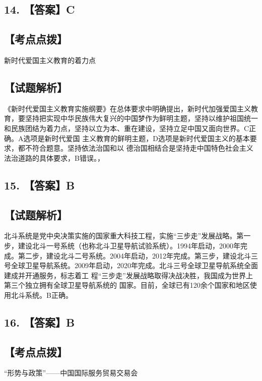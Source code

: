\documentclass[UTF8,11pt]{ctexart}
\begin{document}
\subsection*{14. 【答案】C}

\subsection*{【考点点拨】}

新时代爱国主义教育的着力点


\subsection*{【试题解析】}

《新时代爱国主义教育实施纲要》在总体要求中明确提出，新时代加强爱国主义教育，要坚持把实现中华民族伟大复兴的中国梦作为鲜明主题，坚持以维护祖国统一和民族团结为着力点，坚持以立为本、重在建设，坚持立足中国又面向世界。C正确。A选项是新时代爱国 主义教育的鲜明主题，D选项是新时代爱国主义的基本要求，都不符合题意。坚持依法治国和以 德治国相结合是坚持走中国特色社会主义法治道路的具体要求，B错误。，


\subsection*{15. 【答案】B}

\subsection*{【试题解析】}

北斗系统是党中央决策实施的国家重大科技工程，实施“三步走”发展战略。第一步，建设北斗一号系统（也称北斗卫星导航试验系统）。1994年启动，2000年完成。第二步，建设北斗二号系统。2004年启动，2012年完成。第三步，建设北斗三号全球卫星导航系统。2009年启动，2020年完成。北斗三号全球卫星导航系统全面建成并开通服务，标志着工 程“三步走”发展战略取得决战决胜，我国成为世界上第三个独立拥有全球卫星导航系统的 国家。目前，全球已有120余个国家和地区使用北斗系统。B正确。


\subsection*{16. 【答案】B}

\subsection*{【考点点拨】}

“形势与政策”——中国国际服务贸易交易会
\end{document}
